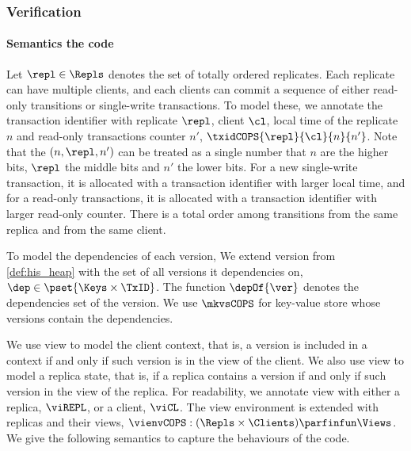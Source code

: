 \subsubsection{Verification}
\paragraph{\bf Semantics the code}
Let \( \repl \in \Repls \) denotes the set of totally ordered replicates.
Each replicate can have multiple clients, and 
each clients can commit a sequence of either read-only transitions or single-write transactions.
To model these, we annotate the transaction identifier with replicate \( \repl \), client \( \cl \), 
local time of the replicate \( n \) and read-only transactions counter \( n' \), \ie \( \txidCOPS{\repl}{\cl}{n}{n'} \).
Note that the \( (n, \repl, n') \) can be treated as a single number that \( n \) are the higher bits, 
\( \repl \) the middle bits and \( n' \) the lower bits.
For a new single-write transaction, it is allocated with a transaction identifier with larger local time,
and for a read-only transactions, it is allocated with a transaction identifier with larger read-only counter.
There is a total order among transitions from the same replica and from the same client.

To model the dependencies of each version,
We extend version from \cref{def:his_heap} 
with the set of all versions it dependencies on, \( \dep \in \pset{\Keys \times \TxID} \).
The function \( \depOf{\ver} \) denotes the dependencies set of the version.
We use \( \mkvsCOPS \) for key-value store whose versions contain the dependencies.

We use view to model the client context,
that is, a version is included in a context if and only if such version is in the view of the client.
We also use view to model a replica state,
that is, if a replica contains a version if and only if such version in the view of the replica.
For readability, we annotate view with either a replica, \( \viREPL \), or a client, \( \viCL \).
The view environment is extended with replicas and their views, \( \vienvCOPS : (\Repls \times \Clients ) \parfinfun \Views \).
We give the following semantics to capture the behaviours of the code.

